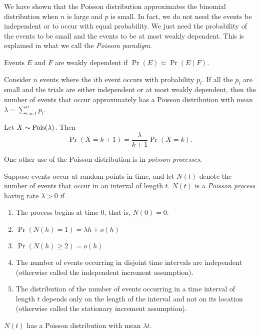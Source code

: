 \documentclass{article}
\begin{document}
We have shown that the Poisson distribution approximates the binomial distribution when $n$ is large and $p$ is small.
In fact, we do not need the events be independent or to occur with equal probability.
We just need the probability of the events to be small and the events to be at most weakly dependent.
This is explained in what we call the \emph{Poisson paradigm}.

\begin{definition}
  Events $E$ and $F$ are weakly dependent if $\Pr(E) \approx \Pr(E \mid F)$.
\end{definition}

\begin{theorem}
  Consider $n$ events where the $i$th event occurs with probability $p_i$.
  If all the $p_i$ are small and the trials are either independent or at most weakly dependent, then the number of events that occur approximately has a Poisson distribution with mean $\lambda = \sum_{i = 1}^n p_i$.
\end{theorem}

\begin{proposition}[Relationship between $\Pr(X = k + 1)$ and $\Pr(X = k)$]
  Let $X \sim \textnormal{Pois}(\lambda)$.
  Then
  \[
    \Pr(X = k + 1) = \frac{\lambda}{k + 1} \Pr(X = k).
  \]
\end{proposition}

One other use of the Poisson distribution is in \emph{poisson processes}.

\begin{theorem}
  Suppose events occur at random points in time, and let $N(t)$ denote the number of events that occur in an interval of length $t$.
  $N(t)$ is a \emph{Poisson process} having rate $\lambda > 0$ if
  \begin{enumerate}
    \item The process begins at time $0$, that is, $N(0) = 0$.
    \item $\Pr(N(h) = 1) = \lambda h + o(h)$
    \item $\Pr(N(h) \geq 2) = o(h)$
    \item The number of events occurring in disjoint time intervals are independent (otherwise called the independent increment assumption).
    \item The distribution of the number of events occurring in a time interval of length $t$ depends only on the length of the interval and not on its location (otherwise called the stationary increment assumption).
  \end{enumerate}
  $N(t)$ has a Poisson distribution with mean $\lambda t$.
\end{theorem}
\end{document}
